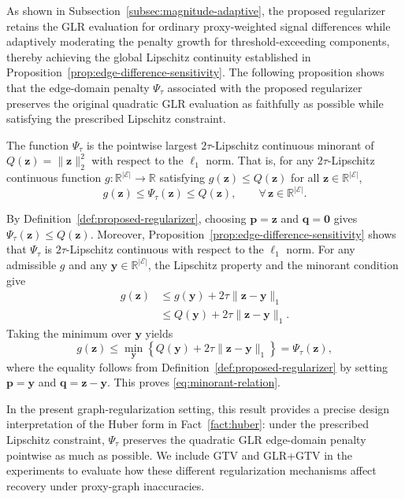 As shown in Subsection~\ref{subsec:magnitude-adaptive}, the proposed regularizer retains the GLR evaluation for ordinary proxy-weighted signal differences while adaptively moderating the penalty growth for threshold-exceeding components, thereby achieving the global Lipschitz continuity established in Proposition~\ref{prop:edge-difference-sensitivity}.
The following proposition shows that the edge-domain penalty $\Psi_{\tau}$ associated with the proposed regularizer preserves the original quadratic GLR evaluation as faithfully as possible while satisfying the prescribed Lipschitz constraint.

\begin{proposition}
\label{prop:largest-lipschitz-minorant}
The function $\Psi_{\tau}$ is the pointwise largest $2\tau$-Lipschitz continuous minorant of $Q(\mathbf{z})=\|\mathbf{z}\|_2^2$ with respect to the $\ell_1$ norm.
That is, for any $2\tau$-Lipschitz continuous function $g:\mathbb{R}^{|\mathcal{E}|}\rightarrow\mathbb{R}$ satisfying $g(\mathbf{z})\leq Q(\mathbf{z})$ for all $\mathbf{z}\in\mathbb{R}^{|\mathcal{E}|}$,
\begin{equation}
g(\mathbf{z})
\leq
\Psi_{\tau}(\mathbf{z})
\leq
Q(\mathbf{z}),
\qquad
\forall\,\mathbf{z}\in\mathbb{R}^{|\mathcal{E}|}.
\label{eq:minorant-relation}
\end{equation}
\end{proposition}

\begin{IEEEproof}
By Definition~\ref{def:proposed-regularizer}, choosing $\mathbf{p}=\mathbf{z}$ and $\mathbf{q}=\mathbf{0}$ gives $\Psi_{\tau}(\mathbf{z})\leq Q(\mathbf{z})$.
Moreover, Proposition~\ref{prop:edge-difference-sensitivity} shows that $\Psi_{\tau}$ is $2\tau$-Lipschitz continuous with respect to the $\ell_1$ norm.
For any admissible $g$ and any $\mathbf{y}\in\mathbb{R}^{|\mathcal{E}|}$, the Lipschitz property and the minorant condition give
\begin{align}
g(\mathbf{z})
&\leq
g(\mathbf{y})
+
2\tau\|\mathbf{z}-\mathbf{y}\|_1
\nonumber
\\
&\leq
Q(\mathbf{y})
+
2\tau\|\mathbf{z}-\mathbf{y}\|_1.
\end{align}
Taking the minimum over $\mathbf{y}$ yields
\begin{equation}
g(\mathbf{z})
\leq
\min_{\mathbf{y}}
\left\{
Q(\mathbf{y})
+
2\tau\|\mathbf{z}-\mathbf{y}\|_1
\right\}
=
\Psi_{\tau}(\mathbf{z}),
\end{equation}
where the equality follows from Definition~\ref{def:proposed-regularizer} by setting $\mathbf{p}=\mathbf{y}$ and $\mathbf{q}=\mathbf{z}-\mathbf{y}$.
This proves \eqref{eq:minorant-relation}.
\end{IEEEproof}

In the present graph-regularization setting, this result provides a precise design interpretation of the Huber form in Fact~\ref{fact:huber}: under the prescribed Lipschitz constraint, $\Psi_\tau$ preserves the quadratic GLR edge-domain penalty pointwise as much as possible.
We include GTV and GLR+GTV in the experiments to evaluate how these different regularization mechanisms affect recovery under proxy-graph inaccuracies.